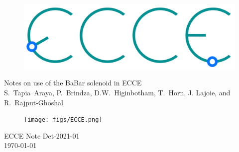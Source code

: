 \renewcommand*\familydefault{\sfdefault}
{\sffamily
\vfill
\vspace{4cm}
\begin{figure}[H]
  \begin{center}
  \includegraphics[width=0.3\linewidth]{figs/ecce-logo.png}
\end{center}
\end{figure}

\vspace{2mm}

\begin{center}
  \large
{\LARGE{Notes on use of the BaBar solenoid in ECCE}} \\
\vspace{0.25cm}
S.~Tapia~Araya, P.~Brindza, D.W.~Higinbotham, T.~Horn, J. Lajoie, and R.~Rajput-Ghoshal
\\
%
%
\end{center}


\vfill
\begin{figure}[H]
  \begin{center}
    \texttt{[image: figs/ECCE.png]}
  \end{center}
\end{figure}
}
\vspace{2.5cm}

\begin{center}
{\LARGE{ECCE Note Det-2021-01}} \\
\vspace{2mm}
{\large{\today}}
\end{center}
\renewcommand*\familydefault{\rmdefault}
